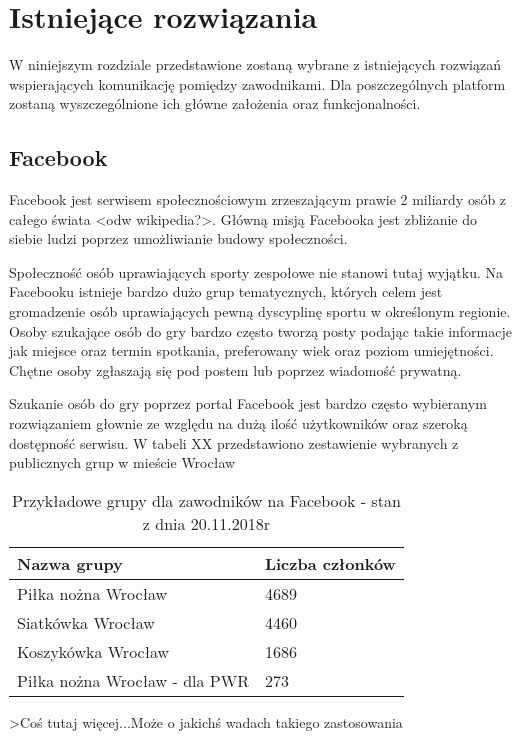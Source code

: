 \chapter{Istniejące rozwiązania}

W niniejszym rozdziale przedstawione zostaną wybrane z istniejących rozwiązań wspierających komunikację pomiędzy zawodnikami. Dla poszczególnych platform zostaną wyszczególnione ich główne założenia oraz funkcjonalności.


\section{Facebook}

Facebook jest serwisem społecznościowym zrzeszającym prawie 2 miliardy osób z całego świata <odw wikipedia?>. Główną misją Facebooka jest zbliżanie do siebie ludzi poprzez umożliwianie budowy społeczności.

Społeczność osób uprawiających sporty zespołowe nie stanowi tutaj wyjątku. Na Facebooku istnieje bardzo dużo grup tematycznych, których celem jest gromadzenie osób uprawiających pewną dyscyplinę sportu w określonym regionie. Osoby szukające osób do gry bardzo często tworzą posty podając takie informacje jak miejsce oraz termin spotkania, preferowany wiek oraz poziom umiejętności. Chętne osoby zgłaszają się pod postem lub poprzez wiadomość prywatną. 

Szukanie osób do gry poprzez portal Facebook jest bardzo często wybieranym rozwiązaniem głownie ze względu na dużą ilość użytkowników oraz szeroką dostępność serwisu. W tabeli XX przedstawiono zestawienie wybranych z publicznych grup w mieście Wrocław


\begin{table}[htb]
\centering\small
\caption{Przykładowe grupy dla zawodników na Facebook - stan z dnia 20.11.2018r}
\label{tab:szablon}
\begin{tabularx}{\linewidth}{|p{.55\linewidth}|X|}\hline
Nazwa grupy & Liczba członków \\ \hline\hline
Piłka nożna Wrocław & 4689  \\ \hline
Siatkówka Wrocław & 4460  \\ \hline
Koszykówka Wrocław & 1686 \\ \hline
Piłka nożna Wrocław - dla PWR & 273  \\ \hline
\end{tabularx}
\end{table}

>Coś tutaj więcej...Może o jakichś wadach takiego zastosowania



